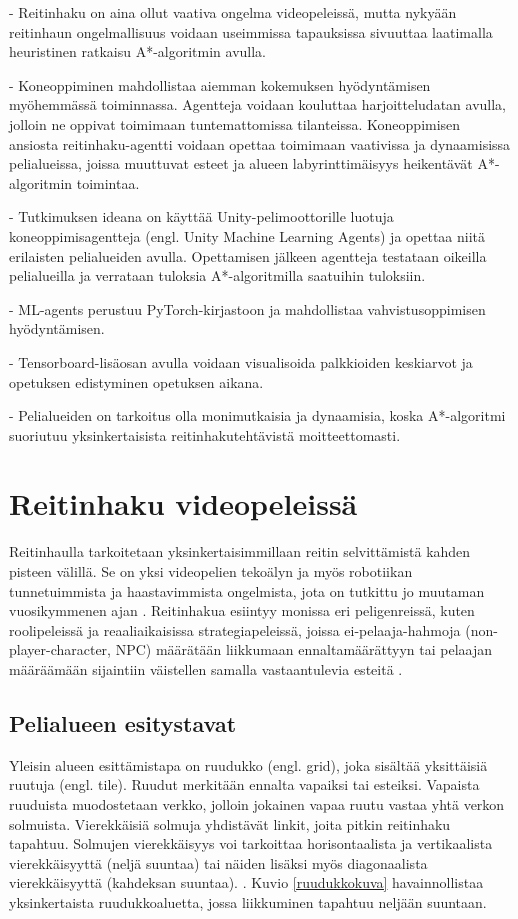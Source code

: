 \documentclass[utf8]{gradu3}
\begin{document}
- Reitinhaku on aina ollut vaativa ongelma videopeleissä, mutta nykyään reitinhaun ongelmallisuus voidaan
useimmissa tapauksissa sivuuttaa laatimalla heuristinen ratkaisu A*-algoritmin avulla.

- Koneoppiminen mahdollistaa aiemman kokemuksen hyödyntämisen myöhemmässä toiminnassa.
Agentteja voidaan kouluttaa harjoitteludatan avulla, jolloin ne oppivat toimimaan tuntemattomissa tilanteissa.
Koneoppimisen ansiosta reitinhaku-agentti voidaan opettaa toimimaan vaativissa ja
dynaamisissa pelialueissa, joissa muuttuvat esteet ja alueen labyrinttimäisyys
heikentävät A*-algoritmin toimintaa.

- Tutkimuksen ideana on käyttää Unity-pelimoottorille luotuja koneoppimisagentteja (engl. Unity Machine Learning Agents)
ja opettaa niitä erilaisten pelialueiden avulla. Opettamisen jälkeen agentteja testataan oikeilla
pelialueilla ja verrataan tuloksia A*-algoritmilla saatuihin tuloksiin.

- ML-agents perustuu PyTorch-kirjastoon ja mahdollistaa vahvistusoppimisen hyödyntämisen.

- Tensorboard-lisäosan avulla voidaan visualisoida palkkioiden keskiarvot ja opetuksen edistyminen opetuksen aikana.

- Pelialueiden on tarkoitus olla monimutkaisia ja dynaamisia, koska A*-algoritmi suoriutuu
yksinkertaisista reitinhakutehtävistä moitteettomasti.

\chapter{Reitinhaku videopeleissä}

Reitinhaulla tarkoitetaan yksinkertaisimmillaan reitin selvittämistä kahden pisteen välillä. Se on yksi videopelien tekoälyn ja myös robotiikan tunnetuimmista ja haastavimmista ongelmista, jota on tutkittu jo muutaman vuosikymmenen ajan \parencite{cui2011based,abd2015comprehensive}. Reitinhakua esiintyy monissa eri peligenreissä, kuten roolipeleissä ja reaaliaikaisissa strategiapeleissä, joissa ei-pelaaja-hahmoja (non-player-character, NPC) määrätään liikkumaan ennaltamäärättyyn tai pelaajan määräämään sijaintiin väistellen samalla vastaantulevia esteitä \parencite{cui2011based}.

\section{Pelialueen esitystavat}

Yleisin alueen esittämistapa on ruudukko (engl. grid), joka sisältää yksittäisiä ruutuja (engl. tile). Ruudut merkitään ennalta vapaiksi tai esteiksi. Vapaista ruuduista muodostetaan verkko, jolloin jokainen vapaa ruutu vastaa yhtä verkon solmuista. Vierekkäisiä solmuja yhdistävät linkit, joita pitkin reitinhaku tapahtuu. Solmujen vierekkäisyys voi tarkoittaa horisontaalista ja vertikaalista vierekkäisyyttä (neljä suuntaa) tai näiden lisäksi myös diagonaalista vierekkäisyyttä (kahdeksan suuntaa). \parencite{botea2013pathfinding,abd2015comprehensive}. Kuvio \ref{ruudukkokuva} havainnollistaa yksinkertaista ruudukkoaluetta, jossa liikkuminen tapahtuu neljään suuntaan.
\end{document}
